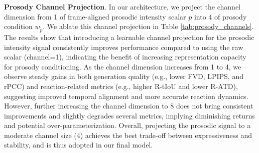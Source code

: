 \textbf{Prosody Channel Projection}. In our architecture, we project the channel dimension from 1 of frame-aligned prosodic intensity scalar $p$ into 4 of prosody condition $w_{\tilde{p}}$. We ablate this channel projection in Table \ref{tab:prosody_channels}. The results show that introducing a learnable channel projection for the prosodic intensity signal consistently improves performance compared to using the raw scalar (channel=1), indicating the benefit of increasing representation capacity for prosody conditioning. As the channel dimension increases from 1 to 4, we observe steady gains in both generation quality (e.g., lower FVD, LPIPS, and rPCC) and reaction-related metrics (e.g., higher R-tIoU and lower R-ATD), suggesting improved temporal alignment and more accurate reaction dynamics. However, further increasing the channel dimension to 8 does not bring consistent improvements and slightly degrades several metrics, implying diminishing returns and potential over-parameterization. Overall, projecting the prosodic signal to a moderate channel size (4) achieves the best trade-off between expressiveness and stability, and is thus adopted in our final model.

